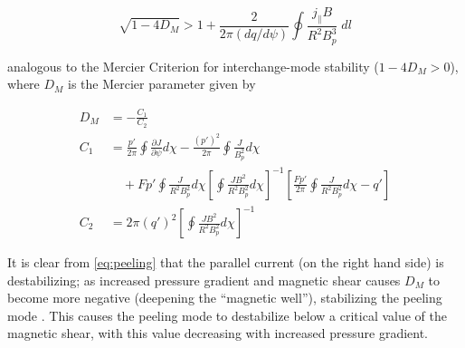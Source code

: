 \begin{equation}\label{eq:peeling}
 \sqrt{1 - 4D_M} > 1 + \frac{2}{2\pi \left(dq/d\psi\right)} \oint \frac{j_\parallel B}{R^2 B_p^3} \;dl
\end{equation}

\noindent analogous to the Mercier Criterion \cite{Mercier1960} for interchange-mode stability ($1 - 4D_M > 0$), where $D_M$ is the Mercier parameter given by

\begin{equation}\label{eq:mercier}
 \begin{aligned}
  D_M &= -\frac{C_1}{C_2}\\
  C_1 &= \frac{p'}{2\pi} \oint \frac{\partial J}{\partial \psi} d\chi - \frac{\left(p'\right)^2}{2\pi} \oint \frac{J}{B_p^2} d\chi\\
  &\quad + Fp' \oint \frac{J}{R^2 B_p^2} d\chi \left[ \oint \frac{JB^2}{R^2 B_p^2} d\chi \right]^{-1} \left[ \frac{Fp'}{2\pi} \oint \frac{J}{R^2 B_p^2} d\chi - q' \right]\\
  C_2 &= 2\pi\left(q'\right)^2 \left[ \oint \frac{JB^2}{R^2 B_p^2} d\chi \right]^{-1}
 \end{aligned}
\end{equation}

\noindent It is clear from \cref{eq:peeling} that the parallel current (on the right hand side) is destabilizing; as increased pressure gradient and magnetic shear causes $D_M$ to become more negative (deepening the ``magnetic well''), stabilizing the peeling mode \cite{Snyder2002,Snyder2004}.  This causes the peeling mode to destabilize below a critical value of the magnetic shear, with this value decreasing with increased pressure gradient.

